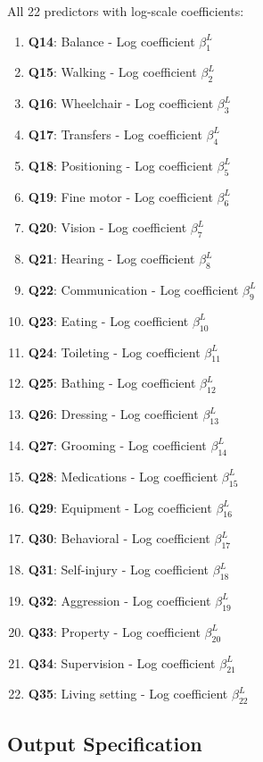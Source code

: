 All 22 predictors with log-scale coefficients:
\begin{enumerate}
    \item \textbf{Q14}: Balance - Log coefficient $\beta_1^L$
    \item \textbf{Q15}: Walking - Log coefficient $\beta_2^L$
    \item \textbf{Q16}: Wheelchair - Log coefficient $\beta_3^L$
    \item \textbf{Q17}: Transfers - Log coefficient $\beta_4^L$
    \item \textbf{Q18}: Positioning - Log coefficient $\beta_5^L$
    \item \textbf{Q19}: Fine motor - Log coefficient $\beta_6^L$
    \item \textbf{Q20}: Vision - Log coefficient $\beta_7^L$
    \item \textbf{Q21}: Hearing - Log coefficient $\beta_8^L$
    \item \textbf{Q22}: Communication - Log coefficient $\beta_9^L$
    \item \textbf{Q23}: Eating - Log coefficient $\beta_{10}^L$
    \item \textbf{Q24}: Toileting - Log coefficient $\beta_{11}^L$
    \item \textbf{Q25}: Bathing - Log coefficient $\beta_{12}^L$
    \item \textbf{Q26}: Dressing - Log coefficient $\beta_{13}^L$
    \item \textbf{Q27}: Grooming - Log coefficient $\beta_{14}^L$
    \item \textbf{Q28}: Medications - Log coefficient $\beta_{15}^L$
    \item \textbf{Q29}: Equipment - Log coefficient $\beta_{16}^L$
    \item \textbf{Q30}: Behavioral - Log coefficient $\beta_{17}^L$
    \item \textbf{Q31}: Self-injury - Log coefficient $\beta_{18}^L$
    \item \textbf{Q32}: Aggression - Log coefficient $\beta_{19}^L$
    \item \textbf{Q33}: Property - Log coefficient $\beta_{20}^L$
    \item \textbf{Q34}: Supervision - Log coefficient $\beta_{21}^L$
    \item \textbf{Q35}: Living setting - Log coefficient $\beta_{22}^L$
\end{enumerate}

\subsection{Output Specification}

